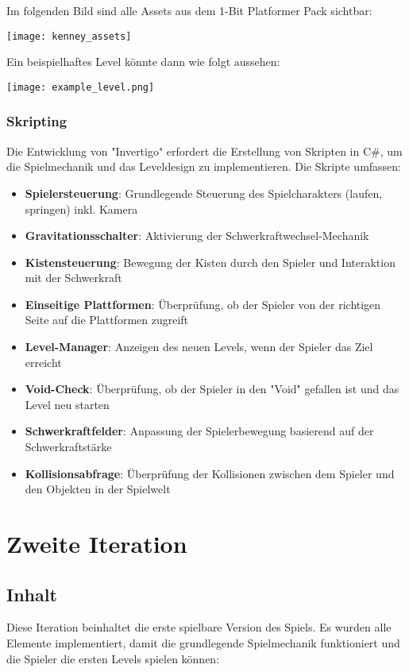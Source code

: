 \documentclass{article}
\begin{document}
Im folgenden Bild sind alle Assets aus dem 1-Bit Platformer Pack sichtbar:

\texttt{[image: kenney\_assets]}

Ein beispielhaftes Level könnte dann wie folgt aussehen:

\texttt{[image: example\_level.png]}

\subsubsection{Skripting}
Die Entwicklung von "Invertigo" erfordert die Erstellung von Skripten in C\#, um die Spielmechanik und das Leveldesign zu implementieren.
Die Skripte umfassen:
\begin{itemize}
    \item \textbf{Spielersteuerung}: Grundlegende Steuerung des Spielcharakters (laufen, springen) inkl. Kamera
    \item \textbf{Gravitationsschalter}: Aktivierung der Schwerkraftwechsel-Mechanik
    \item \textbf{Kistensteuerung}: Bewegung der Kisten durch den Spieler und Interaktion mit der Schwerkraft
    \item \textbf{Einseitige Plattformen}: Überprüfung, ob der Spieler von der richtigen Seite auf die Plattformen zugreift
    \item \textbf{Level-Manager}: Anzeigen des neuen Levels, wenn der Spieler das Ziel erreicht
    \item \textbf{Void-Check}: Überprüfung, ob der Spieler in den "Void" gefallen ist und das Level neu starten
    \item \textbf{Schwerkraftfelder}: Anpassung der Spielerbewegung basierend auf der Schwerkraftstärke
    \item \textbf{Kollisionsabfrage}: Überprüfung der Kollisionen zwischen dem Spieler und den Objekten in der Spielwelt
\end{itemize}

\newpage

\section{Zweite Iteration}

\subsection{Inhalt}

Diese Iteration beinhaltet die erste spielbare Version des Spiels. Es wurden alle Elemente implementiert, damit die grundlegende Spielmechanik funktioniert
und die Spieler die ersten Levels spielen können:
\end{document}

